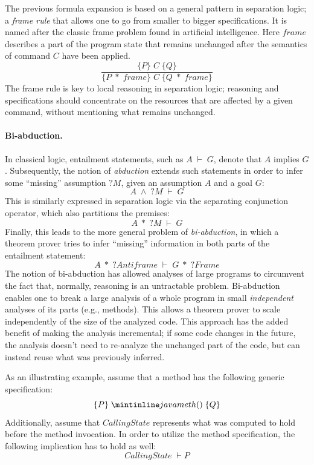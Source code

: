 The previous formula expansion is based on a general pattern in separation logic; a \emph{frame rule} that allows one to go from smaller to bigger specifications. It is named after the classic frame problem found in artificial intelligence. Here $frame$ describes a part of the program state that remains unchanged after the semantics of command $C$ have been applied.
\[
\frac
{\{P\} \; C \;  \{Q\}}
{\{P \; * \; frame \} \; C \;  \{Q \; * \; frame \}}
\]
The frame rule is key to local reasoning in separation logic; reasoning and specifications should concentrate on the resources that are affected by a given command, without mentioning what remains unchanged.

\paragraph{Bi-abduction.}
In classical logic, entailment statements, such as $A \; \vdash \; G$, denote that $A$ implies $G$. Subsequently, the notion of \emph{abduction} extends such statements in order to infer some ``missing'' assumption $?M$, given an assumption $A$ and a goal $G$:
\[
A \; \land \; ?M \; \vdash \; G
\]
This is similarly expressed in separation logic via the separating conjunction operator, which also partitions the premises:
\[
A \; * \; ?M \; \vdash \; G
\]
Finally, this leads to the more general problem of \emph{bi-abduction}, in which a theorem prover tries to infer ``missing'' information in both parts of the entailment statement:
\[
A \; * \; ?Antiframe \; \vdash \; G \; * \; ?Frame
\]
The notion of bi-abduction has allowed analyses of large programs to circumvent the fact that, normally, reasoning is an untractable problem. Bi-abduction enables one to break a large analysis of a whole program in small \emph{independent} analyses of its parts (e.g., methods). This allows a theorem prover to scale independently of the size of the analyzed code. This approach has the added benefit of making the analysis incremental; if some code changes in the future, the analysis doesn't need to re-analyze the unchanged part of the code, but can instead reuse what was previously inferred.


As an illustrating example, assume that a method has the following generic specification:
\[
\{ P \} \; \code{meth()} \; \{ Q \}
\]
Additionally, assume that $CallingState$ represents what was computed to hold before the method invocation. In order to utilize the method specification, the following implication has to hold as well:
\[
CallingState \; \vdash P
\]

